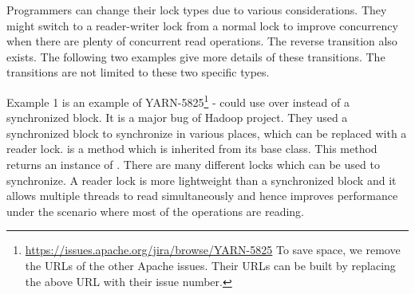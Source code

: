Programmers can change their lock types due to various considerations. They might switch to a reader-writer lock \cite{journals/cacm/CouroisHP71} from a normal lock to improve concurrency when there are plenty of concurrent read operations. The reverse transition also exists. The following two examples give more details of these transitions. The transitions are not limited to these two specific types.%


Example 1 is an example of YARN-5825\footnote{\url{https://issues.apache.org/jira/browse/YARN-5825} To save space, we remove the URLs of the other Apache issues. Their URLs can be built by replacing the above URL with their issue number.} -  could use  over  instead of a synchronized block. It is a major bug of Hadoop project. They used a synchronized block to synchronize in various places, which can be replaced with a reader lock.  is a method  which is inherited from its base class. This method returns an instance of . There are many different locks which can be used to synchronize. A reader lock is more lightweight than a synchronized block and it allows multiple threads to read simultaneously and hence improves performance under the scenario where most of the operations are reading.

